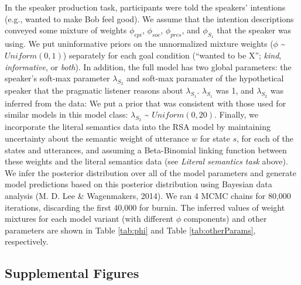 \documentclass[floatsintext,man]{apa6}
\theoremstyle{definition}
\theoremstyle{definition}
\theoremstyle{definition}
\theoremstyle{remark}
\begin{document}
In the speaker production task, participants were told the speakers'
intentions (e.g., wanted to make Bob feel good). We assume that the
intention descriptions conveyed some mixture of weights \(\phi_{epi}\),
\(\phi_{soc}\), \(\phi_{pres}\), and \(\phi_{S_1}\) that the speaker was
using. We put uninformative priors on the unnormalized mixture weights
(\(\phi\) \textasciitilde{} \(Uniform(0,1)\)) separately for each goal
condition (\enquote{wanted to be X}; \emph{kind}, \emph{informative}, or
\emph{both}). In addition, the full model has two global parameters: the
speaker's soft-max parameter \(\lambda_{S_2}\) and soft-max paramater of
the hypothetical speaker that the pragmatic listener reasons about
\(\lambda_{S_1}\). \(\lambda_{S_1}\) was 1, and \(\lambda_{S_2}\) was
inferred from the data: We put a prior that was consistent with those
used for similar models in this model class: \(\lambda_{S_2}\)
\textasciitilde{} \(Uniform(0,20)\). Finally, we incorporate the literal
semantics data into the RSA model by maintaining uncertainty about the
semantic weight of utterance \(w\) for state \(s\), for each of the
states and utterances, and assuming a Beta-Binomial linking function
between these weights and the literal semantics data (see \emph{Literal
semantics task} above). We infer the posterior distribution over all of
the model parameters and generate model predictions based on this
posterior distribution using Bayesian data analysis (M. D. Lee \&
Wagenmakers, 2014). We ran 4 MCMC chains for 80,000 iterations,
discarding the first 40,000 for burnin. The inferred values of weight
mixtures for each model variant (with different \(\phi\) components) and
other parameters are shown in Table \ref{tab:phi} and Table
\ref{tab:otherParams}, respectively.

\newpage

\subsection{Supplemental Figures}\label{supplemental-figures}
\end{document}
